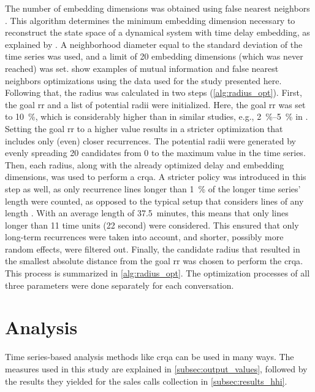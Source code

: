 The number of embedding dimensions was obtained using false nearest neighbors \citep{Kennel1992determining}.
This algorithm determines the minimum embedding dimension necessary to reconstruct the state space of a dynamical system with time delay embedding, as explained by \citet{Abarbanel1993local}.
A neighborhood diameter equal to the standard deviation of the time series was used, and a limit of 20 embedding dimensions (which was never reached) was set.
 show examples of mutual information and false nearest neighbors optimizations using the data used for the study presented here.
Following that, the radius was calculated in two steps (\cref{alg:radius_opt}).
First, the goal \ac{rr} and a list of potential radii were initialized.
Here, the goal \ac{rr} was set to \SI{10}{\percent}, which is considerably higher than in similar studies, e.g., \SIrange{2}{5}{\percent} in \citet{Coco2014crqa-r}.
Setting the goal \ac{rr} to a higher value results in a stricter optimization that includes only (even) closer recurrences.
The potential radii were generated by evenly spreading 20 candidates from 0 to the maximum value in the time series.
Then, each radius, along with the already optimized delay and embedding dimensions, was used to perform a \ac{crqa}.
A stricter policy was introduced in this step as well, as only recurrence lines longer than \SI{1}{\percent} of the longer time series' length were counted, as opposed to the typical setup that considers lines of any length \citep[e.g., as in ][]{Borrie2019syncing}.
With an average length of \SI{37.5}{minutes}, this means that only lines longer than 11 time units (22 second) were considered.
This ensured that only long-term recurrences were taken into account, and shorter, possibly more random effects, were filtered out.
Finally, the candidate radius that resulted in the smallest absolute distance from the goal \ac{rr} was chosen to perform the \ac{crqa}.
This process is summarized in \cref{alg:radius_opt}.
The optimization processes of all three parameters were done separately for each conversation.

\section{Analysis}
\label{sec:analysis_hhi}

Time series-based analysis methods like \ac{crqa} can be used in many ways.
The measures used in this study are explained in \cref{subsec:output_values}, followed by the results they yielded for the sales calls collection in \cref{subsec:results_hhi}.

